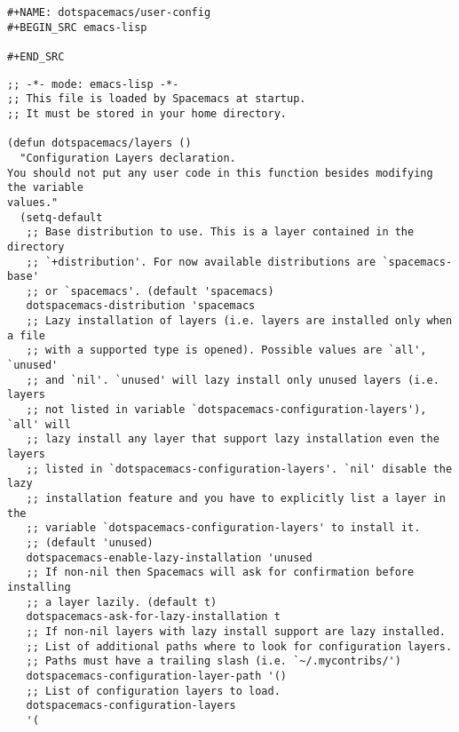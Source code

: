 \documentclass[11pt]{article}
\begin{document}
\begin{verbatim}
#+NAME: dotspacemacs/user-config
#+BEGIN_SRC emacs-lisp

#+END_SRC
\end{verbatim}

\begin{verbatim}
;; -*- mode: emacs-lisp -*-
;; This file is loaded by Spacemacs at startup.
;; It must be stored in your home directory.

(defun dotspacemacs/layers ()
  "Configuration Layers declaration.
You should not put any user code in this function besides modifying the variable
values."
  (setq-default
   ;; Base distribution to use. This is a layer contained in the directory
   ;; `+distribution'. For now available distributions are `spacemacs-base'
   ;; or `spacemacs'. (default 'spacemacs)
   dotspacemacs-distribution 'spacemacs
   ;; Lazy installation of layers (i.e. layers are installed only when a file
   ;; with a supported type is opened). Possible values are `all', `unused'
   ;; and `nil'. `unused' will lazy install only unused layers (i.e. layers
   ;; not listed in variable `dotspacemacs-configuration-layers'), `all' will
   ;; lazy install any layer that support lazy installation even the layers
   ;; listed in `dotspacemacs-configuration-layers'. `nil' disable the lazy
   ;; installation feature and you have to explicitly list a layer in the
   ;; variable `dotspacemacs-configuration-layers' to install it.
   ;; (default 'unused)
   dotspacemacs-enable-lazy-installation 'unused
   ;; If non-nil then Spacemacs will ask for confirmation before installing
   ;; a layer lazily. (default t)
   dotspacemacs-ask-for-lazy-installation t
   ;; If non-nil layers with lazy install support are lazy installed.
   ;; List of additional paths where to look for configuration layers.
   ;; Paths must have a trailing slash (i.e. `~/.mycontribs/')
   dotspacemacs-configuration-layer-path '()
   ;; List of configuration layers to load.
   dotspacemacs-configuration-layers
   '(















\end{verbatim}
\end{document}

